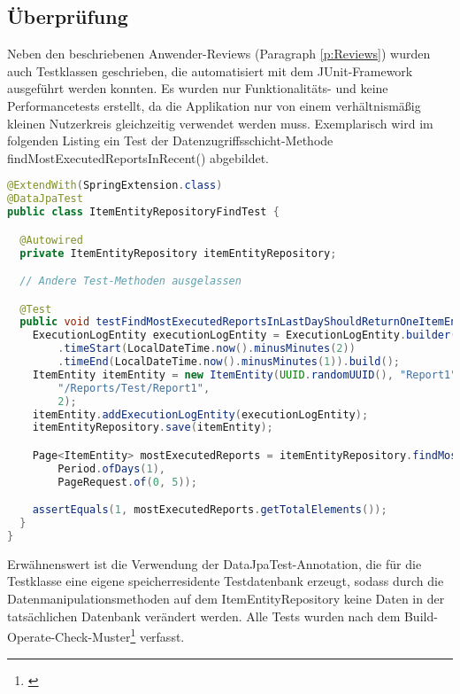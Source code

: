 \subsection{Überprüfung}
\label{sec:Ueberpruefung}
Neben den beschriebenen Anwender-Reviews (Paragraph \ref{p:Reviews}) wurden auch Testklassen geschrieben, die automatisiert mit dem JUnit-Framework ausgeführt werden konnten. Es wurden nur Funktionalitäts- und keine Performancetests erstellt, da die Applikation nur von einem verhältnismäßig kleinen Nutzerkreis gleichzeitig verwendet werden muss. Exemplarisch wird im folgenden Listing ein Test der Datenzugriffsschicht-Methode findMostExecutedReportsInRecent() abgebildet.
\begin{lstlisting}[language=Java,caption={ItemEntityRepositoryFindTest}]
@ExtendWith(SpringExtension.class)
@DataJpaTest
public class ItemEntityRepositoryFindTest {

  @Autowired
  private ItemEntityRepository itemEntityRepository;

  // Andere Test-Methoden ausgelassen

  @Test
  public void testFindMostExecutedReportsInLastDayShouldReturnOneItemEntity() {
    ExecutionLogEntity executionLogEntity = ExecutionLogEntity.builder()
        .timeStart(LocalDateTime.now().minusMinutes(2))
        .timeEnd(LocalDateTime.now().minusMinutes(1)).build();
    ItemEntity itemEntity = new ItemEntity(UUID.randomUUID(), "Report1",
        "/Reports/Test/Report1",
        2);
    itemEntity.addExecutionLogEntity(executionLogEntity);
    itemEntityRepository.save(itemEntity);

    Page<ItemEntity> mostExecutedReports = itemEntityRepository.findMostExecutedReportsInRecent(
        Period.ofDays(1),
        PageRequest.of(0, 5));

    assertEquals(1, mostExecutedReports.getTotalElements());
  }
}
\end{lstlisting}
Erwähnenswert ist die Verwendung der DataJpaTest-Annotation, die für die Testklasse eine eigene speicherresidente Testdatenbank erzeugt, sodass durch die Datenmanipulationsmethoden auf dem ItemEntityRepository keine Daten in der tatsächlichen Datenbank verändert werden. Alle Tests wurden nach dem Build-Operate-Check-Muster\footnote{\cite{fitnesse:boc}} verfasst.


